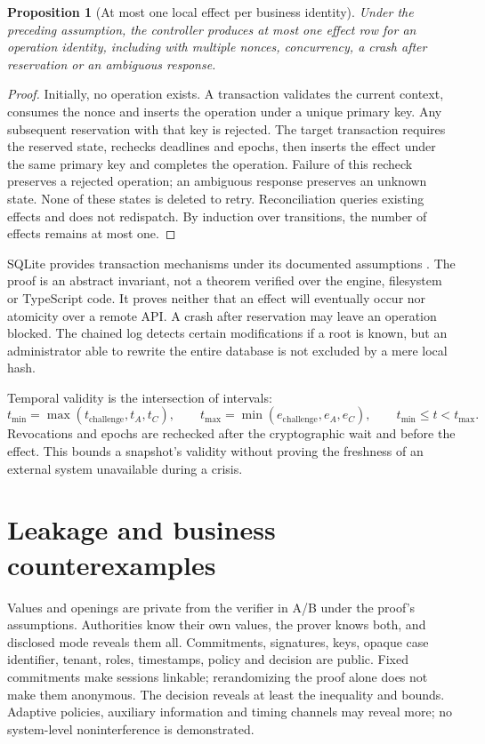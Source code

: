 \documentclass[11pt,a4paper]{article}
\newtheorem{theorem}{Proposition}
\begin{document}
\begin{theorem}[At most one local effect per business identity]
Under the preceding assumption, the controller produces at most one effect
row for an operation identity, including with multiple nonces, concurrency,
a crash after reservation or an ambiguous response.
\end{theorem}
\begin{proof}
Initially, no operation exists. A transaction validates the current context,
consumes the nonce and inserts the operation under a unique primary key.
Any subsequent reservation with that key is rejected. The target transaction
requires the reserved state, rechecks deadlines and epochs, then inserts the
effect under the same primary key and completes the operation. Failure of
this recheck preserves a rejected operation; an ambiguous response preserves
an unknown state. None of these states is deleted to retry.
Reconciliation queries existing effects and does not redispatch.
By induction over transitions, the number of effects remains at most one.
\end{proof}
SQLite provides transaction mechanisms under its documented assumptions
\cite{sqlite,sqliteatomic}. The proof is an abstract invariant, not a theorem
verified over the engine, filesystem or TypeScript code.
It proves neither that an effect will eventually occur nor atomicity over
a remote API. A crash after reservation may leave an operation blocked.
The chained log detects certain modifications if a root is known, but an
administrator able to rewrite the entire database is not excluded by a
mere local hash.

Temporal validity is the intersection of intervals:
\[
t_{\min}=\max(t_{\mathrm{challenge}},t_A,t_C),\qquad
t_{\max}=\min(e_{\mathrm{challenge}},e_A,e_C),\qquad
t_{\min}\le t<t_{\max}.
\]
Revocations and epochs are rechecked after the cryptographic wait and before
the effect. This bounds a snapshot's validity without proving the freshness
of an external system unavailable during a crisis.

\section{Leakage and business counterexamples}
Values and openings are private from the verifier in A/B under the proof's
assumptions. Authorities know their own values, the prover knows both, and
disclosed mode reveals them all.
Commitments, signatures, keys, opaque case identifier, tenant, roles,
timestamps, policy and decision are public. Fixed commitments make sessions
linkable; rerandomizing the proof alone does not make them anonymous.
The decision reveals at least the inequality and bounds. Adaptive policies,
auxiliary information and timing channels may reveal more; no system-level
noninterference is demonstrated.
\end{document}
